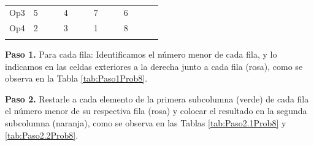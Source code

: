 \documentclass[12pt]{article}  %
\begin{document}
\begin{table}[H]
\begin{tabular}{ccllcllcllclll}
\multicolumn{1}{c|}{Op3}               & \multicolumn{1}{c|}{\cellcolor[HTML]{67FD9A}5} & \multicolumn{1}{l|}{\cellcolor[HTML]{FFCC67}} & \multicolumn{1}{l|}{\cellcolor[HTML]{FCFF2F}} & \multicolumn{1}{c|}{\cellcolor[HTML]{67FD9A}4} & \multicolumn{1}{l|}{\cellcolor[HTML]{FFCC67}} & \multicolumn{1}{l|}{\cellcolor[HTML]{F8FF00}} & \multicolumn{1}{c|}{\cellcolor[HTML]{67FD9A}7} & \multicolumn{1}{l|}{\cellcolor[HTML]{FFCC67}} & \multicolumn{1}{l|}{\cellcolor[HTML]{F8FF00}} & \multicolumn{1}{c|}{\cellcolor[HTML]{67FD9A}6} & \multicolumn{1}{l|}{\cellcolor[HTML]{FFC702}} & \multicolumn{1}{l|}{\cellcolor[HTML]{F8FF00}} & \cellcolor[HTML]{FFCCC9} \\ \cline{2-13}
\multicolumn{1}{c|}{Op4}               & \multicolumn{1}{c|}{\cellcolor[HTML]{67FD9A}2} & \multicolumn{1}{l|}{\cellcolor[HTML]{FFCC67}} & \multicolumn{1}{l|}{\cellcolor[HTML]{FCFF2F}} & \multicolumn{1}{c|}{\cellcolor[HTML]{67FD9A}3} & \multicolumn{1}{l|}{\cellcolor[HTML]{FFCC67}} & \multicolumn{1}{l|}{\cellcolor[HTML]{F8FF00}} & \multicolumn{1}{c|}{\cellcolor[HTML]{67FD9A}1} & \multicolumn{1}{l|}{\cellcolor[HTML]{FFCC67}} & \multicolumn{1}{l|}{\cellcolor[HTML]{F8FF00}} & \multicolumn{1}{c|}{\cellcolor[HTML]{67FD9A}8} & \multicolumn{1}{l|}{\cellcolor[HTML]{FFC702}} & \multicolumn{1}{l|}{\cellcolor[HTML]{F8FF00}} & \cellcolor[HTML]{FFCCC9} \\ \cline{2-13}
\multicolumn{1}{l}{}                   & \multicolumn{1}{l}{}                           & \cellcolor[HTML]{FD6864}                      &                                               & \multicolumn{1}{l}{}                           & \cellcolor[HTML]{FD6864}                      &                                               & \multicolumn{1}{l}{}                           & \cellcolor[HTML]{FD6864}                      &                                               & \multicolumn{1}{l}{}                           & \cellcolor[HTML]{FD6864}                      &                                               &                         
\end{tabular}
\end{table}

\textbf{Paso 1.} Para cada fila: Identificamos el número menor de cada fila, y lo indicamos en las celdas exteriores a la derecha junto a cada fila (rosa), como se observa en la Tabla \ref{tab:Paso1Prob8}.

\textbf{Paso 2.} Restarle a cada elemento de la primera subcolumna (verde) de cada fila el número menor de su respectiva fila (rosa) y colocar el resultado en la segunda subcolumna (naranja), como se observa en las Tablas \ref{tab:Paso2.1Prob8} y \ref{tab:Paso2.2Prob8}.
\end{document}
